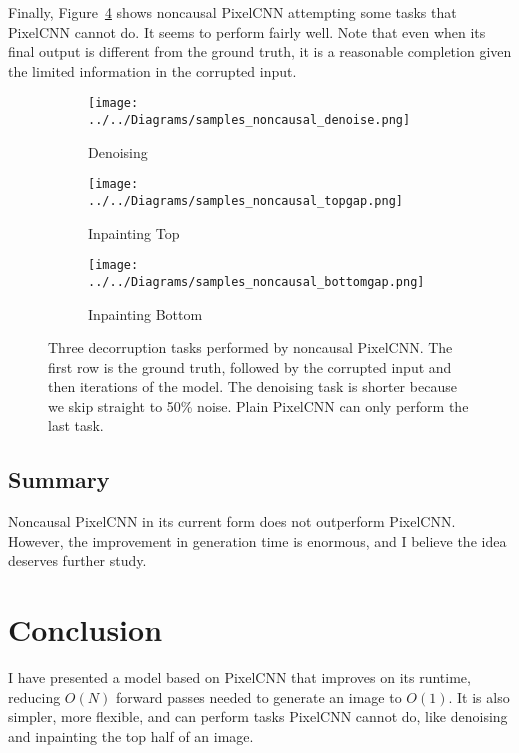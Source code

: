 \documentclass[11pt, a4paper, openany]{book}
\begin{document}
Finally, Figure~\ref{decorruption} shows noncausal PixelCNN attempting some tasks that PixelCNN cannot do. It seems to perform fairly well. Note that even when its final output is different from the ground truth, it is a reasonable completion given the limited information in the corrupted input.

\begin{figure}
  \centering    
    \begin{subfigure}{0.32\columnwidth}
        \centering
        \caption{Denoising}
        \texttt{[image: ../../Diagrams/samples\_noncausal\_denoise.png]} 
        \label{decorruption:denoise}
    \end{subfigure}
    \hfill
    \begin{subfigure}{0.32\columnwidth}
        \centering
        \caption{Inpainting Top}
        \texttt{[image: ../../Diagrams/samples\_noncausal\_topgap.png]} 
        \label{decorruption:topgap}
    \end{subfigure}
    \hfill
    \begin{subfigure}{0.32\columnwidth}
        \centering
        \caption{Inpainting Bottom}
        \texttt{[image: ../../Diagrams/samples\_noncausal\_bottomgap.png]} 
        \label{decorruption:bottomgap}
    \end{subfigure}
  \caption[Decorruption by noncausal PixelCNN]{Three decorruption tasks performed by noncausal PixelCNN. The first row is the ground truth, followed by the corrupted input and then iterations of the model. The denoising task is shorter because we skip straight to 50\% noise. Plain PixelCNN can only perform the last task.}
  \label{decorruption}
\end{figure}

\section{Summary}

Noncausal PixelCNN in its current form does not outperform PixelCNN. However, the improvement in generation time is enormous, and I believe the idea deserves further study.

\chapter{Conclusion}
\label{cha:conclusion}

I have presented a model based on PixelCNN that improves on its runtime, reducing $O(N)$ forward passes needed to generate an image to $O(1)$. It is also simpler, more flexible, and can perform tasks PixelCNN cannot do, like denoising and inpainting the top half of an image.
\end{document}
